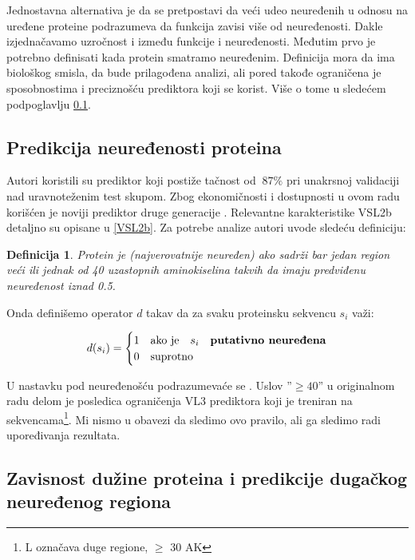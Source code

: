 Jednostavna alternativa je da se pretpostavi da veći udeo neuređenih u odnosu
na uređene proteine podrazumeva da funkcija zavisi više od neuređenosti.  Dakle
izjednačavamo uzročnost  i  između funkcije i
neuređenosti. Međutim prvo je potrebno definisati kada protein smatramo
neuređenim.  Definicija mora da ima biološkog smisla, da bude prilagođena
analizi, ali pored takođe ograničena je sposobnostima i preciznošću prediktora
koji se korist.  Više o tome u sledećem podpoglavlju \ref{naredno}.

\subsection{Predikcija neuređenosti proteina}
\label{naredno}

Autori \parencite{Xie2007} koristili su  prediktor koji
postiže tačnost od $~87\%$ pri unakrsnoj validaciji nad uravnoteženim test
skupom.  Zbog ekonomičnosti i dostupnosti u ovom radu korišćen je noviji
prediktor druge generacije .
Relevantne karakteristike VSL2b detaljno su opisane u \ref{VSL2b}.
Za potrebe analize autori \parencite{Xie2007} uvode sledeću definiciju:

\newtheorem{mydef}{Definicija}
\begin{mydef}
\label{pdis_def}
Protein je (najverovatnije neuređen) 
ako sadrži bar jedan region veći ili jednak od 40 uzastopnih aminokiselina
takvih da imaju \textit{predviđenu neuređenost} iznad 0.5. 
\end{mydef}

Onda definišemo operator $d$ takav da za svaku proteinsku sekvencu $s_i$ važi:

\[   
  d(s_i) = 
    \begin{cases}
      1 & \text{ako je} \quad s_i \quad \textbf{putativno neuređena}\\
      0 & \text{suprotno}
    \end{cases}
\]

U nastavku pod neuređenošću podrazumevaće se .
Uslov ''$\ge40$'' u originalnom radu delom je posledica ograničenja VL3
prediktora koji je treniran na  sekvencama\footnote{L označava
duge regione, $\ge$ 30 AK}. Mi nismo u obavezi da sledimo ovo pravilo, ali ga sledimo
radi upoređivanja rezultata.

\subsection{Zavisnost dužine proteina i predikcije dugačkog neuređenog regiona}

